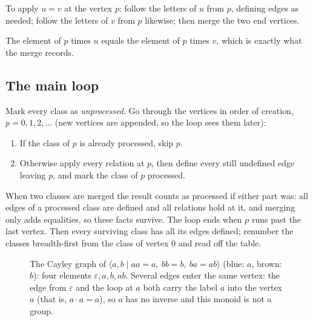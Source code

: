 \documentclass[11pt]{article}
\begin{document}
\begin{definitionbox}
To apply $u=v$ at the vertex $p$: follow the letters of $u$ from $p$, defining edges as needed; follow the letters of $v$ from $p$ likewise; then merge the two end vertices.
\end{definitionbox}
The element of $p$ times $u$ equals the element of $p$ times $v$, which is exactly what the merge records.

\subsection{The main loop}
Mark every class as \emph{unprocessed}. Go through the vertices in order of creation, $p=0,1,2,\dots$ (new vertices are appended, so the loop sees them later):
\begin{enumerate}[leftmargin=1.7em]
  \item If the class of $p$ is already processed, skip $p$.
  \item Otherwise apply every relation at $p$, then define every still undefined edge leaving $p$, and mark the class of $p$ processed.
\end{enumerate}
When two classes are merged the result counts as processed if either part was: all edges of a processed class are defined and all relations hold at it, and merging only adds equalities, so these facts survive.
The loop ends when $p$ runs past the last vertex. Then every surviving class has all its edges defined; renumber the classes breadth-first from the class of vertex $0$ and read off the table.

\begin{figure}[H]
\centering
{}
\caption{The Cayley graph of $\langle a,b\mid aa=a,\ bb=b,\ ba=ab\rangle$ (blue: $a$, brown: $b$): four elements $\varepsilon,a,b,ab$. Several edges enter the same vertex: the edge from $\varepsilon$ and the loop at $a$ both carry the label $a$ into the vertex $a$ (that is, $a\cdot a=a$), so $a$ has no inverse and this monoid is not a group.}\label{fig:tc_semilattice}
\end{figure}
\end{document}

